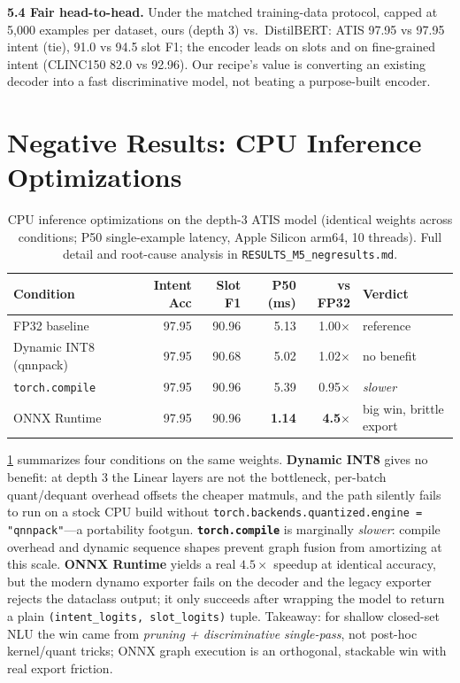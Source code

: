 \documentclass{article}
\begin{document}
\textbf{5.4 Fair head-to-head.} Under the matched training-data protocol,
capped at 5{,}000 examples per dataset, ours (depth 3)
vs.\ DistilBERT: ATIS 97.95 vs 97.95 intent (tie), 91.0 vs 94.5 slot F1; the
encoder leads on slots and on fine-grained intent (CLINC150 82.0 vs 92.96). Our
recipe's value is converting an existing decoder into a fast discriminative
model, not beating a purpose-built encoder.

\section{Negative Results: CPU Inference Optimizations}\label{sec:negresults}

\begin{table}[t]\centering
\caption{CPU inference optimizations on the depth-3 ATIS model (identical
weights across conditions; P50 single-example latency, Apple Silicon arm64, 10
threads). Full detail and root-cause analysis in
\texttt{RESULTS\_M5\_negresults.md}.}
\label{tab:negresults}
\small
\begin{tabular}{lrrrrl}
\toprule
Condition & Intent Acc & Slot F1 & P50 (ms) & vs FP32 & Verdict\\
\midrule
FP32 baseline & 97.95 & 90.96 & 5.13 & 1.00$\times$ & reference\\
Dynamic INT8 (qnnpack) & 97.95 & 90.68 & 5.02 & 1.02$\times$ & no benefit\\
\texttt{torch.compile}~\citep{ansel2024torchcompile} & 97.95 & 90.96 & 5.39 & 0.95$\times$ & \emph{slower}\\
ONNX Runtime~\citep{onnxruntime2019} & 97.95 & 90.96 & \textbf{1.14} & \textbf{4.5$\times$} & big win, brittle export\\
\bottomrule
\end{tabular}
\end{table}

\cref{tab:negresults} summarizes four conditions on the same weights.
\textbf{Dynamic INT8} gives no benefit: at depth 3 the Linear layers are not
the bottleneck, per-batch quant/dequant overhead offsets the cheaper matmuls,
and the path silently fails to run on a stock CPU build without
\texttt{torch.backends.quantized.engine = "qnnpack"}---a portability footgun.
\textbf{\texttt{torch.compile}} is marginally \emph{slower}: compile overhead
and dynamic sequence shapes prevent graph fusion from amortizing at this scale.
\textbf{ONNX Runtime} yields a real $4.5\times$ speedup at identical accuracy,
but the modern dynamo exporter fails on the decoder and the legacy exporter
rejects the dataclass output; it only succeeds after wrapping the model to
return a plain \texttt{(intent\_logits, slot\_logits)} tuple. Takeaway: for
shallow closed-set NLU the win came from \emph{pruning + discriminative
single-pass}, not post-hoc kernel/quant tricks; ONNX graph execution is an
orthogonal, stackable win with real export friction.
\end{document}
